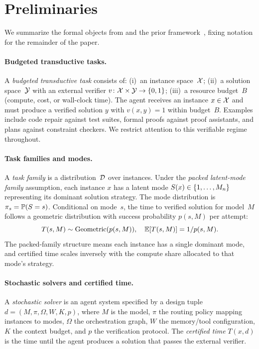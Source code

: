 \section{Preliminaries}
\label{sec:prelim}

We summarize the formal objects from \citet{achille2025agents} and the prior framework~\citep{beneventano2026framework}, fixing notation for the remainder of the paper.

\paragraph{Budgeted transductive tasks.}
A \emph{budgeted transductive task} consists of:
(i)~an instance space~$\mathcal{X}$;
(ii)~a solution space~$\mathcal{Y}$ with an external verifier $v\colon \mathcal{X} \times \mathcal{Y} \to \{0,1\}$;
(iii)~a resource budget~$B$ (compute, cost, or wall-clock time).
The agent receives an instance $x \in \mathcal{X}$ and must produce a verified solution $y$ with $v(x,y) = 1$ within budget~$B$.
Examples include code repair against test suites, formal proofs against proof assistants, and plans against constraint checkers.
We restrict attention to this verifiable regime throughout.

\paragraph{Task families and modes.}
A \emph{task family} is a distribution~$\mathcal{D}$ over instances.
Under the \emph{packed latent-mode family} assumption, each instance $x$ has a latent mode $S(x) \in \{1, \ldots, M_n\}$ representing its dominant solution strategy.
The mode distribution is $\pi_s = \mathbb{P}(S = s)$.
Conditional on mode~$s$, the time to verified solution for model~$M$ follows a geometric distribution with success probability $p(s, M)$ per attempt:
\begin{equation}
\label{eq:geometric-trials}
  T(s, M) \sim \mathrm{Geometric}(p(s, M)), \quad \mathbb{E}[T(s,M)] = 1/p(s,M).
\end{equation}
The packed-family structure means each instance has a single dominant mode, and certified time scales inversely with the compute share allocated to that mode's strategy.

\paragraph{Stochastic solvers and certified time.}
A \emph{stochastic solver} is an agent system specified by a design tuple $d = (M, \pi, \Omega, W, K, p)$, where $M$ is the model, $\pi$ the routing policy mapping instances to modes, $\Omega$ the orchestration graph, $W$ the memory/tool configuration, $K$ the context budget, and $p$ the verification protocol.
The \emph{certified time} $T(x, d)$ is the time until the agent produces a solution that passes the external verifier.

